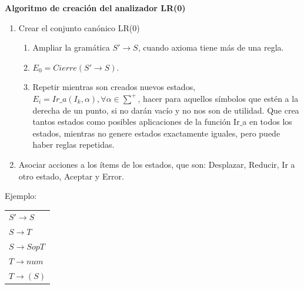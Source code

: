 \documentclass[12pt, twoside, openright]{report} %
\begin{document}
\textbf{Algoritmo de creación del analizador LR(0)}
\begin{enumerate}
	\item Crear el conjunto canónico LR(0)
	      \begin{enumerate}
		      \item Ampliar la gramática $S'\rightarrow S$, cuando axioma tiene más de una regla.
		      \item $E_0 = Cierre(S'\rightarrow S)$.
		      \item Repetir mientras son creados nuevos estados, $E_i = Ir\_a(I_k, \alpha), \forall \alpha \in \sum^+$, hacer para aquellos símbolos que estén a la derecha de un punto, si no darán vacío y no nos son de utilidad. Que crea tantos estados como posibles aplicaciones de la función Ir$\_$a en todos los estados, mientras no genere estados exactamente iguales, pero puede haber reglas repetidas.
	      \end{enumerate}
	\item Asociar acciones a los ítems de los estados, que son: Desplazar, Reducir, Ir a otro estado, Aceptar y Error.
\end{enumerate}

Ejemplo:
\begin{table}[H]
	\centering
	\begin{tabular}{l}
		$S' \rightarrow S$              \\
		$S \rightarrow T$               \\
		$S \rightarrow S \textit{op} T$ \\
		$T \rightarrow \textit{num}$    \\
		$T \rightarrow ( S )$
	\end{tabular}
\end{table}
\end{document}
